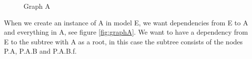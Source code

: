 \documentclass{cslthse-msc}
\begin{document}
\begin{figure}[h]
    \centering
    \qquad
    \subfloat{{}}
    \caption{Graph A}
    \label{fig:GraphA}
\end{figure}

When we create an instance of A in model E, we want dependencies from E to A and everything in A, see figure \ref{fig:graphA}. We want to have a dependency from E to the subtree with A as a root, in this case the subtree consists of the nodes P.A, P.A.B and P.A.B.f.
\end{document}
